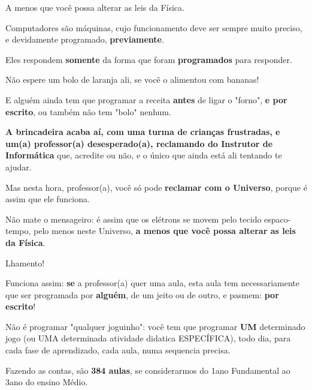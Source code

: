 \begin{multicols}{2}
A menos que você possa alterar as leis da Física.

%
%


%

Computadores são máquinas, cujo funcionamento deve ser sempre muito preciso, e devidamente programado, \textbf{previamente}.

Eles respondem \textbf{somente} da forma que foram \textbf{programados} para responder.

Não espere um bolo de laranja ali, se você o alimentou com bananas!

E alguém ainda tem que programar a receita \textbf{antes} de ligar o "forno", \textbf{e por escrito}, ou também não tem "bolo" \space nenhum.

\textbf{A brincadeira acaba aí, com uma turma de crianças frustradas, e um(a) professor(a) desesperado(a), reclamando do Instrutor de Informática} que, acredite ou não, e o único que ainda está ali tentando te ajudar.

Mas nesta hora, professor(a), você só pode \textbf{reclamar com o Universo}, porque é assim que ele funciona.

Não mate o mensageiro: é assim que os elétrons se movem pelo tecido espaco-tempo, pelo menos neste Universo, \textbf{a menos que você possa alterar as leis da Física}.

Lhamento!

Funciona assim: \textbf{se} a professor(a) quer uma aula, esta aula tem necessariamente que ser programada por \textbf{alguém}, de um jeito ou de outro, e pasmem: \textbf{por escrito}!

Não é programar "qualquer joguinho": você tem que programar \textbf{UM} determinado jogo (ou UMA determinada atividade didatica ESPECÍFICA), todo dia, para cada fase de aprendizado, cada aula, numa sequencia precisa.

Fazendo as contas, são \textbf{384 aulas}, se considerarmos do 1\textordmasculine\space ano Fundamental ao 3\textordmasculine\space ano do ensino Médio.


\end{multicols}

